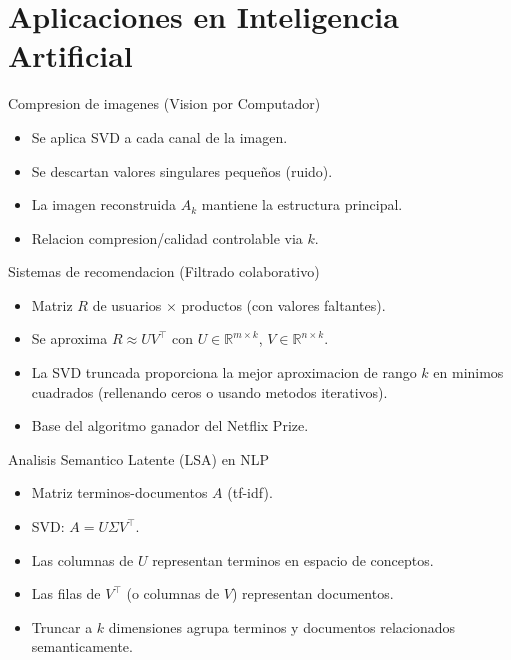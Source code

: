 \documentclass[aspectratio=169, 10pt, xcolor=table]{beamer}
\begin{document}
\section{Aplicaciones en Inteligencia Artificial}

\begin{frame}{Compresion de imagenes (Vision por Computador)}
    \begin{itemize}
        \item Se aplica SVD a cada canal de la imagen.
        \item Se descartan valores singulares pequeños (ruido).
        \item La imagen reconstruida $A_k$ mantiene la estructura principal.
        \item Relacion compresion/calidad controlable via $k$.
    \end{itemize}
\end{frame}

\begin{frame}{Sistemas de recomendacion (Filtrado colaborativo)}
    \begin{itemize}
        \item Matriz $R$ de usuarios $\times$ productos (con valores faltantes).
        \item Se aproxima $R \approx UV^\top$ con $U\in\mathbb{R}^{m\times k}$, $V\in\mathbb{R}^{n\times k}$.
        \item La SVD truncada proporciona la mejor aproximacion de rango $k$ en minimos cuadrados (rellenando ceros o usando metodos iterativos).
        \item Base del algoritmo ganador del Netflix Prize.
    \end{itemize}
\end{frame}

\begin{frame}{Analisis Semantico Latente (LSA) en NLP}
    \begin{itemize}
        \item Matriz terminos-documentos $A$ (tf-idf).
        \item SVD: $A = U\Sigma V^\top$.
        \item Las columnas de $U$ representan terminos en espacio de conceptos.
        \item Las filas de $V^\top$ (o columnas de $V$) representan documentos.
        \item Truncar a $k$ dimensiones agrupa terminos y documentos relacionados semanticamente.
    \end{itemize}
\end{frame}
\end{document}
